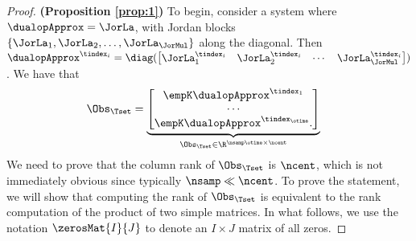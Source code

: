 \begin{proof}
 \textbf{(Proposition \ref{prop:1})}
 To begin, consider a system where $\dualopApprox = \JorLa$, with Jordan blocks $\{\JorLa_1, \JorLa_2, \dots, \JorLa_{\JorMul}\}$ along the 
 diagonal. Then $\dualopApprox^{\tindex_i} = \diag(\begin{bmatrix}\JorLa_1^{\tindex_i} & \JorLa_2^{\tindex_i} & \cdots & \JorLa_{\JorMul}^{\tindex_i}\end{bmatrix})$. 
 We have that 
 \begin{align*}
 \Obs_{\Tset} &=
 \underbrace{
 \begin{bmatrix} 
  \empK \dualopApprox^{\tindex_1}\\
  \cdots\\
  \empK \dualopApprox^{\tindex_\otime}.
 \end{bmatrix}}_{\Obs_{\Tset}\in\R^{\nsamp\otime\times\ncent}}
 \end{align*}
 We need to prove that the column rank of $\Obs_{\Tset}$ is $\ncent$, which is not immediately
 obvious since typically $\nsamp \ll \ncent$. To prove the statement, we will show that 
 computing the rank of $\Obs_{\Tset}$ is equivalent to the rank computation of the product of 
 two simple matrices. In what follows,
 we use the notation $\zerosMat{I}{J}$ to denote an $I\times J$ matrix of all zeros. 
 

\end{proof}
